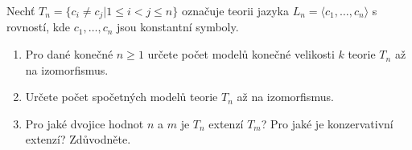 \documentclass[a4paper,12pt]{article}
\begin{document}
\medskip\begin{problem}
Nechť $T_n = \{c_i \neq c_j | 1 \leq i < j \leq n\}$ označuje teorii jazyka $L_n = \langle c_1, \dots, c_n \rangle$ s rovností, kde $c_1, \dots, c_n$ jsou konstantní symboly.
\begin{enumerate}    
    \item Pro dané konečné $n \geq 1$ určete počet modelů konečné velikosti $k$ teorie $T_n$ až na izomorfismus. 
    \item Určete počet spočetných modelů teorie $T_n$ až na izomorfismus. 
    \item Pro jaké dvojice hodnot $n$ a $m$ je $T_n$ extenzí $T_m$? Pro jaké je konzervativní extenzí? Zdůvodněte.
\end{enumerate}
\end{problem}
\end{document}
